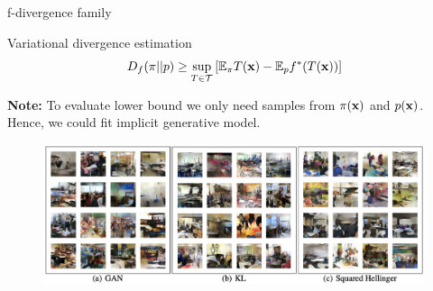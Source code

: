 \begin{frame}{f-divergence family}
	\begin{block}{Variational divergence estimation}
		\[
			D_f(\pi || p) \geq \sup_{T \in \mathcal{T}} \left[\mathbb{E}_{\pi}T(\mathbf{x}) -  \mathbb{E}_p f^*(T(\mathbf{x})) \right]
		\]
	\end{block}
	\textbf{Note:} To evaluate lower bound we only need samples from $\pi(\mathbf{x})$ and $p(\mathbf{x})$. Hence, we could fit implicit generative model.
	\begin{figure}
		\centering
		\includegraphics[width=1.0\linewidth]{figs/f_div_results}
	\end{figure}

\end{frame}
